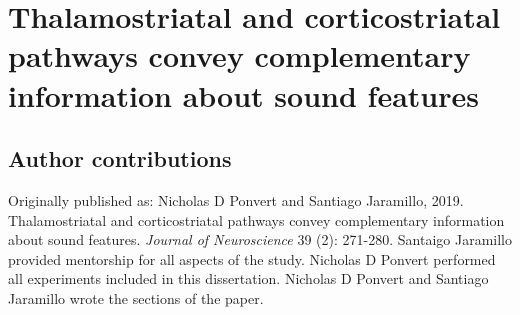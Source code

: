 \newcommand{\Anatomy}{1}
\newcommand{\AnatomyInjection}{\Anatomy A}
\newcommand{\AnatomyThalExample}{\Anatomy B}
\newcommand{\AnatomyThalSummary}{\Anatomy C}
\newcommand{\AnatomyThalamus}{\Anatomy B, C}
\newcommand{\AnatomyACExample}{\Anatomy D}
\newcommand{\AnatomyACSummary}{\Anatomy E}
\newcommand{\AnatomyAC}{\Anatomy D, E}

\newcommand{\Method}{2}
\newcommand{\MethodDiagram}{\Method A}
\newcommand{\MethodDirectCell}{\Method B}
\newcommand{\MethodDirectCellAndNBQXPop}{\Method B, F}
\newcommand{\MethodIndirectNoFollow}{\Method C}
\newcommand{\MethodLongLatency}{\Method C, D}
\newcommand{\MethodIndirectFollows}{\Method D}
\newcommand{\MethodSoundCharPop}{\Method E}

\newcommand{\NoiseLaser}{3}
\newcommand{\NoiseLaserThalDiagram}{\NoiseLaser A}
\newcommand{\NoiseLaserThalExample}{\NoiseLaser B}
\newcommand{\NoiseLaserThalLocations}{\NoiseLaser C}
\newcommand{\NoiseLaserACDiagram}{\NoiseLaser D}
\newcommand{\NoiseLaserACExample}{\NoiseLaser E}
\newcommand{\NoiseLaserACLocations}{\NoiseLaser F}
\newcommand{\NoiseLaserDiagrams}{\NoiseLaser A, D}

\newcommand{\Frequency}{4}
\newcommand{\FrequencyThalExample}{\Frequency A}
\newcommand{\FrequencyACExample}{\Frequency B}
\newcommand{\FrequencyBW}{\Frequency C}
\newcommand{\FrequencyThreshold}{\Frequency D}
\newcommand{\FrequencyLatency}{\Frequency E}
\newcommand{\FrequencyOnsetivity}{\Frequency F}
\newcommand{\FrequencyMonotonicity}{\Frequency G}

\newcommand{\AM}{5}
\newcommand{\AMThalExamples}{\AM A, B}
\newcommand{\AMACExamples}{\AM E, F}
\newcommand{\AMPies}{\AM C}
\newcommand{\AMSync}{\AM D}
\newcommand{\AMRateDiscrim}{\AM G}
\newcommand{\AMPhaseDiscrim}{\AM H}

\chapter{Thalamostriatal and corticostriatal pathways convey complementary information about sound features}

\section{Author contributions}
\noindent Originally published as: Nicholas D Ponvert and Santiago Jaramillo, 2019. Thalamostriatal and corticostriatal pathways convey complementary information about sound features. \textit{Journal of Neuroscience} 39 (2): 271-280. 
%
Santaigo Jaramillo provided mentorship for all aspects of the study. Nicholas D Ponvert performed all experiments included in this dissertation. Nicholas D Ponvert and Santiago Jaramillo wrote the sections of the paper. 

